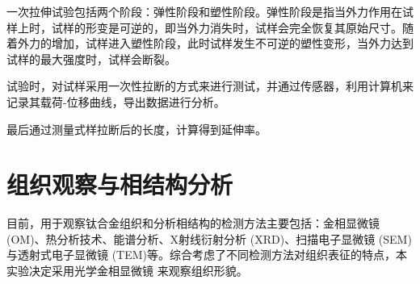 一次拉伸试验包括两个阶段：弹性阶段和塑性阶段。弹性阶段是指当外力作用在试样上时，试样的形变是可逆的，即当外力消失时，试样会完全恢复其原始尺寸。随着外力的增加，试样进入塑性阶段，此时试样发生不可逆的塑性变形，当外力达到试样的最大强度时，试样会断裂。

试验时，对试样采用一次性拉断的方式来进行测试，并通过传感器，利用计算机来记录其载荷-位移曲线，导出数据进行分析。

最后通过测量式样拉断后的长度，计算得到延伸率。

\section{组织观察与相结构分析}
目前，用于观察钛合金组织和分析相结构的检测方法主要包括：金相显微镜 (OM)、热分析技术、能谱分析、X射线衍射分析 (XRD)、扫描电子显微镜 (SEM)与透射式电子显微镜 (TEM)等。综合考虑了不同检测方法对组织表征的特点，本实验决定采用光学金相显微镜 来观察组织形貌。

